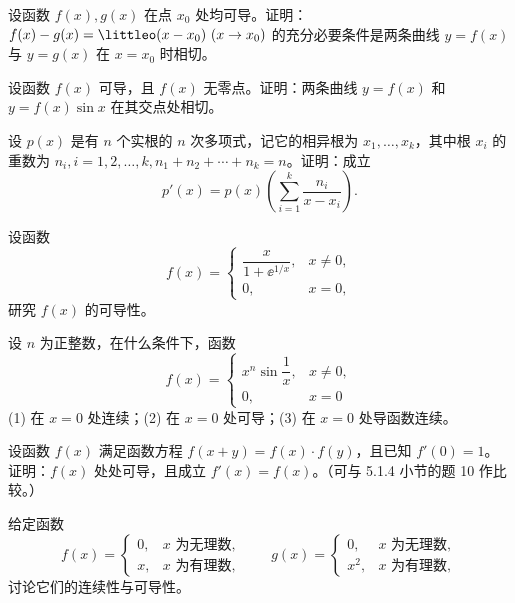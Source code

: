 \begin{xexercise}[4]
设函数 $f(x),g(x)$ 在点 $x_0$ 处均可导。证明：$f(x)-g(x)=\littleo(x-x_0)\ (x\to x_0)$ 的充分必要条件是两条曲线 $y=f(x)$ 与 $y=g(x)$ 在 $x=x_0$ 时相切。
\end{xexercise}

\begin{xexercise}[5]
设函数 $f(x)$ 可导，且 $f(x)$ 无零点。证明：两条曲线 $y=f(x)$ 和 $y=f(x)\sin x$ 在其交点处相切。
\end{xexercise}

\begin{xexercise}[6]
设 $p(x)$ 是有 $n$ 个实根的 $n$ 次多项式，记它的相异根为 $x_1,\ldots,x_k$，其中根 $x_i$ 的重数为 $n_i,i=1,2,\ldots,k,n_1+n_2+\cdots+n_k=n$。证明：成立
  \[
    p'(x)=p(x)\left(\sum_{i=1}^k\frac{n_i}{x-x_i}\right).
  \]
\end{xexercise}

\begin{xexercise}[7]
设函数
  \[
    f(x)=
    \begin{cases}
      \dfrac{x}{1+\ee^{1/x}}, & x\ne0,\\[4pt]
      0, & x=0,
    \end{cases}
  \]
  研究 $f(x)$ 的可导性。
\end{xexercise}

\begin{xexercise}[8]
设 $n$ 为正整数，在什么条件下，函数
  \[
    f(x)=
    \begin{cases}
      x^n\sin\dfrac1x, & x\ne0,\\[4pt]
      0, & x=0
    \end{cases}
  \]
  (1) 在 $x=0$ 处连续；(2) 在 $x=0$ 处可导；(3) 在 $x=0$ 处导函数连续。
\end{xexercise}

\begin{xexercise}[9]
设函数 $f(x)$ 满足函数方程 $f(x+y)=f(x)\cdot f(y)$，且已知 $f'(0)=1$。证明：$f(x)$ 处处可导，且成立 $f'(x)=f(x)$。（可与 5.1.4 小节的题 10 作比较。）
\end{xexercise}

\begin{xexercise}[10]
给定函数
  \[
    f(x)=\begin{cases}0,&x\text{ 为无理数},\\x,&x\text{ 为有理数},\end{cases}
    \qquad
    g(x)=\begin{cases}0,&x\text{ 为无理数},\\x^2,&x\text{ 为有理数},\end{cases}
  \]
  讨论它们的连续性与可导性。
\end{xexercise}


